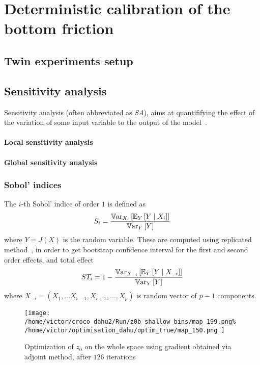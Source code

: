\documentclass[../../Main_ManuscritThese.tex]{subfiles}
\begin{document}
\section{Deterministic calibration of the bottom friction}
\label{sec:deterministic_calibration_bott}
\subsection{Twin experiments setup}


\subsection{Sensitivity analysis}
\label{sec:sensitivity-analysis}

Sensitivity analysis (often abbreviated as \emph{SA}), aims at quantififying the effect of the variation of some input variable to the output of the model~\cite{iooss_revue_2011,janon_analyse_2012}.

\paragraph{Local sensitivity analysis}

\paragraph{Global sensitivity analysis}


\subsubsection{Sobol' indices}
\label{sec:sobol-indices}
\cite{janon_analyse_2012}
The $i$-th Sobol' indice of order $1$ is defined as 
\begin{equation}
  S_i = \frac{\mathbb{V}\mathrm{ar}_{X_i}\left[\mathbb{E}_{Y}\left[Y \mid X_i\right]\right]}{\mathbb{V}\mathrm{ar}_{Y}\left[Y\right]}
\end{equation}
where $Y = J(X)$ is the random variable.
These are computed using replicated method~\cite{gilquin_making_2019,gilquin_echantillonnages_2016}, in order to get bootstrap confidence interval for the first and second order effects, and total effect
\begin{equation}
 ST_i = 1 - \frac{\mathbb{V}\mathrm{ar}_{X_{-i}}\left[\mathbb{E}_{Y}\left[Y \mid X_{-i}\right]\right]}{\mathbb{V}\mathrm{ar}_{Y}\left[Y\right]}
\end{equation}
where $X_{-i} = (X_1,\dots X_{i-1},X_{i+1},\dots,X_p)$ is random vector of $p-1$ components.
 \begin{figure}[ht]
  \centering
  \texttt{[image: /home/victor/croco\_dahu2/Run/z0b\_shallow\_bins/map\_199.png\% /home/victor/optimisation\_dahu/optim\_true/map\_150.png
  ]}
  \caption{\label{fig:optimization_map_126} Optimization of $z_0$ on the whole space using gradient obtained via adjoint method, after $126$ iterations}
\end{figure}
\end{document}
